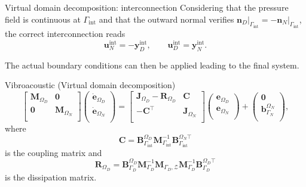 \documentclass[aspectratio=169]{ISAE-Beamer}
\begin{document}
\begin{frame}{Virtual domain decomposition: interconnection}
Considering that the pressure field is continuous at $\Gamma_{\text{int}}$ and that the outward normal verifies $\bm{n}_D \vert_{\Gamma_{\text{int}}}= - \bm{n}_N \vert_{\Gamma_{\text{int}}}$, the correct interconnection reads 
\begin{equation*}
\mathbf{u}_N^{\text{int}} = - \mathbf{y}_D^{\text{int}}, \qquad
\mathbf{u}_D^{\text{int}} = \mathbf{y}_N^{\text{int}}.
\end{equation*}

The actual boundary conditions can then be applied leading to the final system.

\begin{block}{Vibroacoustic (Virtual domain decomposition)}
\setlength{\abovedisplayskip}{1pt}
\setlength{\belowdisplayskip}{1pt}
\begin{equation*}
\begin{bmatrix}
\mathbf{M}_{\Omega_D} & \mathbf{0} \\
\mathbf{0} & \mathbf{M}_{\Omega_N} \\
\end{bmatrix}
\begin{pmatrix}
\dot{\mathbf{e}}_{\Omega_D} \\
\dot{\mathbf{e}}_{\Omega_N} \\
\end{pmatrix}
= \begin{bmatrix}
\mathbf{J}_{\Omega_D} - \mathbf{R}_{\Omega_D}  & \mathbf{C}\\
-\mathbf{C}^\top & \mathbf{J}_{\Omega_N} \\
\end{bmatrix} 
\begin{pmatrix}
{\mathbf{e}}_{\Omega_D} \\
{\mathbf{e}}_{\Omega_N} \\
\end{pmatrix} + 
\begin{pmatrix}
\mathbf{0}\\
\mathbf{b}_{\Gamma_N}^{\Omega_N}\\
\end{pmatrix},
\end{equation*}
where 
\[\mathbf{C} = \mathbf{B}_{\Gamma_{\text{int}}}^{\Omega_D} \mathbf{M}_{\Gamma_{\text{int}}}^{-1} \mathbf{B}_{\Gamma_{\text{int}}}^{\Omega_N \top}\]
is the coupling matrix and
\[
\mathbf{R}_{\Omega_D} = \mathbf{B}_{\Gamma_D}^{\Omega_D} \mathbf{M}_{\Gamma_D}^{-1} \mathbf{M}_{\Gamma_D, \mathcal{Z}} \mathbf{M}_{\Gamma_D}^{-1} \mathbf{B}_{\Gamma_D}^{\Omega_D \top}
\]
is the dissipation matrix.
\end{block}

\end{frame}
\end{document}
